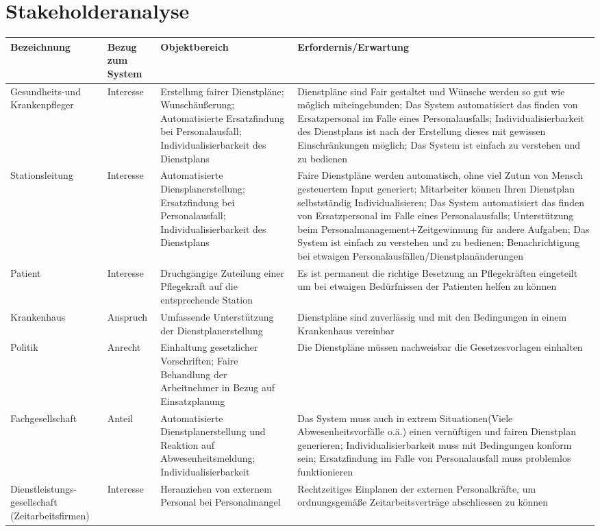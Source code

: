 \documentclass[10pt,a4paper]{article}
\begin{document}
\section{Stakeholderanalyse}
\begin{longtable}{ |  p{3cm} |  p{3cm} | p{3cm} | p{3cm} |}
    \hline
    Bezeichnung & Bezug zum System & Objektbereich & Erfordernis/Erwartung \\ \hline
    Gesundheits-und Krankenpfleger & Interesse & Erstellung fairer Dienstpläne; Wunschäußerung; Automatisierte Ersatzfindung bei Personalausfall; Individualisierbarkeit des Dienstplans & Dienstpläne sind Fair gestaltet und Wünsche werden so gut wie möglich miteingebunden; Das System automatisiert das finden von Ersatzpersonal im Falle eines Personalausfalls; Individualisierbarkeit des Dienstplans ist nach der Erstellung dieses mit gewissen Einschränkungen möglich; Das System ist einfach zu verstehen und zu bedienen \\ \hline
    Stationsleitung & Interesse & Automatisierte Diensplanerstellung; Ersatzfindung bei Personalausfall; Individualisierbarkeit des Dienstplans & Faire Dienstpläne werden automatisch, ohne viel Zutun von Mensch gesteuertem Input generiert; Mitarbeiter können Ihren Dienstplan selbstständig Individualisieren; Das System automatisiert das finden von Ersatzpersonal im Falle eines Personalausfalls; Unterstützung beim Personalmanagement+Zeitgewinnung für andere Aufgaben; Das System ist einfach zu verstehen und zu bedienen; Benachrichtigung bei etwaigen Personalausfällen/Dienstplanänderungen \\ \hline
    Patient & Interesse & Druchgängige Zuteilung einer Pflegekraft auf die entsprechende Station & Es ist permanent die richtige Besetzung an Pflegekräften eingeteilt um bei etwaigen Bedürfnissen der Patienten helfen zu können \\
    \hline
    Krankenhaus & Anspruch & Umfassende Unterstützung der Dienstplanerstellung & Dienstpläne sind zuverlässig und mit den Bedingungen in einem Krankenhaus vereinbar \\
    \hline
    Politik & Anrecht & Einhaltung gesetzlicher Vorschriften; Faire Behandlung der Arbeitnehmer in Bezug auf Einsatzplanung & Die Dienstpläne müssen nachweisbar die Gesetzesvorlagen einhalten \\
    \hline
    Fachgesellschaft & Anteil & Automatisierte Dienstplanerstellung und Reaktion auf Abwesenheitsmeldung; Individualisierbarkeit & Das System muss auch in extrem Situationen(Viele Abwesenheitsvorfälle o.ä.) einen vernüftigen und fairen Dienstplan generieren; Individualisierbarkeit muss mit Bedingungen konform sein; Ersatzfindung im Falle von Personalausfall muss problemlos funktionieren \\
    \hline
    Dienstleistungs- gesellschaft (Zeitarbeitsfirmen) & Interesse & Heranziehen von externem Personal bei Personalmangel & Rechtzeitiges Einplanen der externen Personalkräfte, um ordnungsgemäße Zeitarbeitsverträge abschliessen zu können \\
    \hline
\end{longtable}
\end{document}
